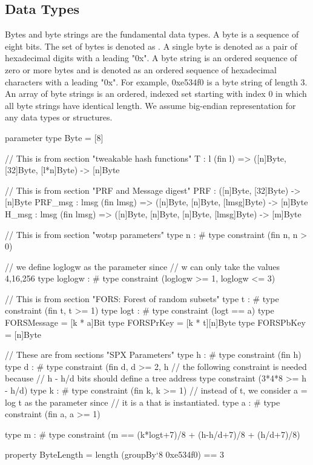\subsection{Data Types}
Bytes and byte strings are the fundamental data types.  A byte is a
sequence of eight bits. The set of bytes is denoted as \byte. A single byte is
denoted as a pair of
hexadecimal digits with a leading "0x".  A byte string is an ordered
sequence of zero or more bytes and is denoted as an ordered sequence
of hexadecimal characters with a leading "0x".  For example, 0xe534f0
is a byte string of length $3$.  An array of byte strings is an
ordered, indexed set starting with index $0$ in which all byte strings
have identical length.  We assume big-endian representation for any
data types or structures.

\begin{code}
  parameter
    type Byte = [8]

    // This is from section "tweakable hash functions"
    T : {l} (fin l) => ([n]Byte, [32]Byte, [l*n]Byte) -> [n]Byte

    // This is from section "PRF and Message digest"
    PRF : ([n]Byte, [32]Byte) -> [n]Byte
    PRF_msg : {lmsg} (fin lmsg) => ([n]Byte, [n]Byte, [lmsg]Byte) -> [n]Byte
    H_msg : {lmsg} (fin lmsg) =>
      ([n]Byte, [n]Byte, [n]Byte, [lmsg]Byte) -> [m]Byte

    // This is from section "wotsp parameters"
    type n : #
    type constraint (fin n, n > 0)

    // we define loglogw as the parameter since
    // w can only take the values 4,16,256
    type loglogw : #
    type constraint (loglogw >= 1, loglogw <= 3)

    // This is from section "FORS: Forest of random subsets"
    type t : #
    type constraint (fin t, t >= 1)
    type logt : #
    type constraint (logt == a)
    type FORSMessage = [k * a]Bit
    type FORSPrKey = [k * t][n]Byte
    type FORSPbKey = [n]Byte

    // These are from sections "SPX Parameters"
    type h : #
    type constraint (fin h)
    type d : #
    type constraint (fin d, d >= 2, h%
    // the following constraint is needed because
    // h - h/d bits should define a tree address
    type constraint (3*4*8 >= h - h/d)
    type k : #
    type constraint (fin k, k >= 1)
    // instead of t, we consider a = log t as the parameter since
    // it is a that is instantiated.
    type a : #
    type constraint (fin a, a >= 1)

    type m : #
    type constraint (m == (k*logt+7)/8 + (h-h/d+7)/8 + (h/d+7)/8)



  property ByteLength = length (groupBy`{8} 0xe534f0) == 3
\end{code}

